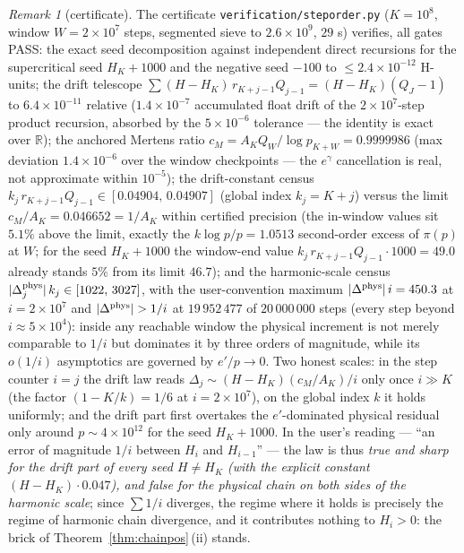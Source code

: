 \documentclass[11pt]{article}
\theoremstyle{remark}
\newtheorem{remark}[theorem]{Remark}
\newcommand{\R}{\mathbb{R}}
\newcommand{\gam}{\gamma}
\begin{document}
\begin{remark}[certificate]\label{rem:invnum}
The certificate \texttt{verification/steporder.py} ($K=10^8$, window
$W=2\times10^7$ steps, segmented sieve to $2.6\times10^9$, $29$ s)
verifies, all gates {\sc PASS}: the exact seed decomposition against
independent direct recursions for the supercritical seed $H_K+1000$
and the negative seed $-100$ to $\le2.4\times10^{-12}$ H-units; the
drift telescope $\sum(H-H_K)\,r_{K+j-1}Q_{j-1}=(H-H_K)(Q_J-1)$ to
$6.4\times10^{-11}$ relative ($1.4\times10^{-7}$ accumulated float
drift of the $2\times10^7$-step product recursion, absorbed by the
$5\times10^{-6}$ tolerance --- the identity is exact over $\R$); the
anchored Mertens ratio $c_M=A_KQ_W/\log p_{K+W}=0.9999986$ (max deviation
$1.4\times10^{-6}$ over the window checkpoints --- the $e^{\gam}$
cancellation is real, not approximate within $10^{-5}$); the
drift-constant census $k_j\,r_{K+j-1}Q_{j-1}\in[0.04904,\,0.04907]$
(global index $k_j=K+j$) versus the
limit $c_M/A_K=0.046652=1/A_K$ within certified precision (the
in-window values sit $5.1\%$ above the limit, exactly the
$k\log p/p=1.0513$ second-order excess of $\pi(p)$ at $W$; for the
seed $H_K+1000$ the window-end value $k_j\,r_{K+j-1}Q_{j-1}\cdot1000=49.0$ already
stands $5\%$ from its limit $46.7$); and the harmonic-scale census
$|\Delta^{\rm phys}_j|\,k_j\in[1022,\,3027]$, with the user-convention
maximum $|\Delta^{\rm phys}|\,i=450.3$ at $i=2\times10^7$ and
$|\Delta^{\rm phys}|>1/i$ at $19\,952\,477$ of $20\,000\,000$ steps
(every step beyond $i\approx5\times10^4$): inside any reachable
window the physical increment is not merely comparable to $1/i$ but
dominates it by three orders of magnitude, while its $o(1/i)$
asymptotics are governed by $e'/p\to0$. Two honest scales: in the
step counter $i=j$ the drift law reads
$\Delta_j\sim(H-H_K)(c_M/A_K)/i$ only once $i\gg K$ (the factor
$(1-K/k)=1/6$ at $i=2\times10^7$), on the global index $k$ it holds
uniformly; and the drift part first overtakes the $e'$-dominated
physical residual only around $p\sim4\times10^{12}$ for the seed
$H_K+1000$. In the user's reading --- ``an error of magnitude $1/i$
between $H_i$ and $H_{i-1}$'' --- the law is thus \emph{true and
sharp for the drift part of every seed $H\ne H_K$ (with the explicit
constant $(H-H_K)\cdot0.047$), and false for the physical chain on
both sides of the harmonic scale}; since $\sum 1/i$ diverges, the
regime where it holds is precisely the regime of harmonic chain
divergence, and it contributes nothing to $H_i>0$: the brick of
Theorem~\ref{thm:chainpos}\,(ii) stands.
\end{remark}
\end{document}

